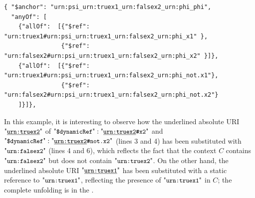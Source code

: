 \begin{querybox}{}
\begin{lstlisting}[style=query,escapechar=Z]
{ "$anchor": "urn:psi_urn:truex1_urn:falsex2_urn:phi_phi", 
  "anyOf": [
    {"allOf":  [{"$ref":  "urn:truex1#urn:psi_urn:truex1_urn:falsex2_urn:phi_x1" },
                {"$ref":  "urn:falsex2#urn:psi_urn:truex1_urn:falsex2_urn:phi_x2" }]},
    {"allOf":  [{"$ref":  "urn:truex1#urn:psi_urn:truex1_urn:falsex2_urn:phi_not.x1"},
                {"$ref":  "urn:falsex2#urn:psi_urn:truex1_urn:falsex2_urn:phi_not.x2"}
    ]}]},
\end{lstlisting}
\end{querybox}

In this example, it is interesting to observe how the underlined absolute URI $\qkw{\underline{urn:truex2}}$
of $\qddref: \qkw{\underline{urn:truex2}\#x2}$ and
$\qddref: \qkw{\underline{urn:truex2}\#not.x2}$ (lines 3 and 4)
has been substituted with $\qkw{urn:falsex2}$ (lines 4 and 6), which reflects the fact that the context $C$ contains
$\qkw{urn:falsex2}$ but does not contain $\qkw{urn:truex2}$. 
On the other hand,  the underlined absolute URI $\qkw{\underline{urn:truex1}}$ has been substituted with
a static reference to $\qkw{urn:truex1}$, reflecting the presence of $\qkw{urn:truex1}$ in $C$;
the complete unfolding is in the {\FV}.

